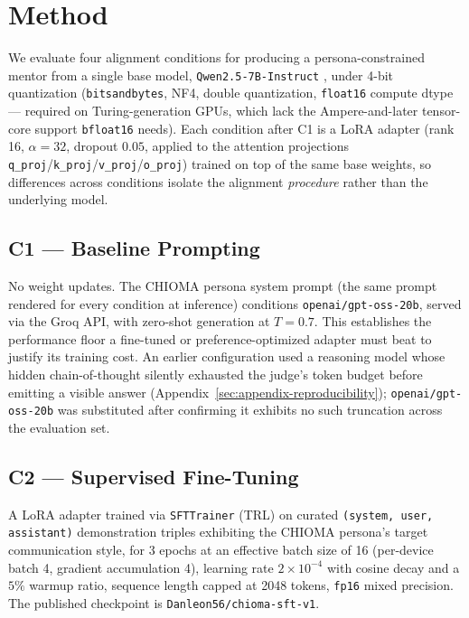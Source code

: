 \section{Method}
\label{sec:method}

We evaluate four alignment conditions for producing a persona-constrained mentor from a single base model, \texttt{Qwen2.5-7B-Instruct} \citep{qwen2024technical}, under 4-bit quantization (\texttt{bitsandbytes}, NF4, double quantization, \texttt{float16} compute dtype — required on Turing-generation GPUs, which lack the Ampere-and-later tensor-core support \texttt{bfloat16} needs). Each condition after C1 is a LoRA adapter (rank 16, $\alpha=32$, dropout $0.05$, applied to the attention projections \texttt{q\_proj}/\texttt{k\_proj}/\texttt{v\_proj}/\texttt{o\_proj}) trained on top of the same base weights, so differences across conditions isolate the alignment \emph{procedure} rather than the underlying model.

\subsection{C1 — Baseline Prompting}
\label{subsec:method-c1}
No weight updates. The CHIOMA persona system prompt (the same prompt rendered for every condition at inference) conditions \texttt{openai/gpt-oss-20b}, served via the Groq API, with zero-shot generation at $T=0.7$. This establishes the performance floor a fine-tuned or preference-optimized adapter must beat to justify its training cost. An earlier configuration used a reasoning model whose hidden chain-of-thought silently exhausted the judge's token budget before emitting a visible answer (Appendix~\ref{sec:appendix-reproducibility}); \texttt{openai/gpt-oss-20b} was substituted after confirming it exhibits no such truncation across the evaluation set.

\subsection{C2 — Supervised Fine-Tuning}
\label{subsec:method-c2}
A LoRA adapter trained via \texttt{SFTTrainer} (TRL) on curated \texttt{(system, user, assistant)} demonstration triples exhibiting the CHIOMA persona's target communication style, for 3 epochs at an effective batch size of 16 (per-device batch 4, gradient accumulation 4), learning rate $2\times10^{-4}$ with cosine decay and a $5\%$ warmup ratio, sequence length capped at 2048 tokens, \texttt{fp16} mixed precision. The published checkpoint is \texttt{Danleon56/chioma-sft-v1}.

